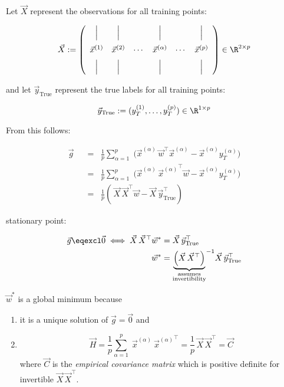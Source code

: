 \begin{frame}

Let $\vec X$ represent the observations for all training points:

\begin{equation}
\vec X := 
\left(
\begin{array}{cccccc}
\Big| & \Big| & & \Big| & & \Big| \\[3mm]
\vec x^{(1)} & \vec x^{(2)} & \cdots & \vec x^{(\alpha)} & \cdots & \vec x^{(p)}\\[2mm]
\Big| & \Big| & & \Big| & & \Big|
\end{array}
\right) \in \R^{2 \times p}
\end{equation}

and let $\vec y_{\text{True}}$ represent the true labels for all training points:

\begin{equation}
\vec y_{\text{True}} := (y_T^{(1)}, \ldots, y_T^{(p)}) \in \R^{1 \times p}
\end{equation}

From this follows:

\begin{align}
\vec g
\;\;&=\;\;
\frac{1}{p} \sum_{\alpha=1}^{p} \;
\big( \vec x^{(\alpha)} \, \vec w^{\top}\vec x^{(\alpha)} - \vec x^{(\alpha)} y_{T}^{(\alpha)} \big)\\
\;\;&=\;\;
\frac{1}{p} \sum_{\alpha=1}^{p} \;
\big( \vec x^{(\alpha)} \, {\vec x^{(\alpha)}}^{\top} \vec w- \vec x^{(\alpha)} y_{T}^{(\alpha)} \big)\\
\;\;&=\;\;
\frac{1}{p} \left(\, \vec X \, \vec X^\top \vec w - \vec X\, \vec y_{\text{True}}^\top \right)
\end{align}

stationary point:

\begin{align}
\vec g \eqexcl \vec 0 \iff \vec X \, \vec X^\top \vec w^*  &= \vec X\, \vec y_{\text{True}}^\top\\
\vec w^* &=
{
\underbrace{
\left(
\vec X \, \vec X^\top
\right)
}_{\substack{\text{assumes}\\ \text{invertibility}}} 
}^{-1} \vec X\, \vec y_{\text{True}}^\top
\end{align}

$\vec w^*$ is a global minimum because

\begin{enumerate}[1.]
\item it is a unique solution of $\vec g = \vec 0$ and
\item 
\begin{equation}
\vec H 
= \frac{1}{p} \sum_{\alpha=1}^{p} \;
\vec x^{(\alpha)}~{\vec x^{(\alpha)}}^\top 
= \frac{1}{p} \, \vec X \, \vec X^\top = \vec C
\end{equation}
where $\vec C$ is the \emph{empirical covariance matrix} which is positive definite for invertible $\vec X\, \vec X^\top$.
\end{enumerate}


\end{frame}
